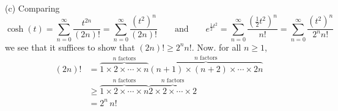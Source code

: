 \begin{solution}
\noindent (c) Comparing
\begin{equation*}
\cosh(t) = \sum_{n=0}^\infty\frac{t^{2n}}{(2n)!}
 = \sum_{n=0}^\infty\frac{{(t^2)}^n}{(2n)!}
\qquad\text{and}\qquad
e^{\frac{1}{2}t^2}
    = \sum_{n=0}^\infty\frac{{(\frac{1}{2}t^2)}^n}{n!}
    = \sum_{n=0}^\infty\frac{{(t^2)}^n}{2^n n!}
\end{equation*}
we see that it suffices to show that $(2n)! \ge 2^n n!$.
Now. for all $n\ge 1$,
\begin{align*}
(2n)! &=\overbrace{1\times 2\times\cdots\times n}^{n\text{ factors}}
      \overbrace{(n+1)\times (n+2)\times\cdots\times 2n}^{n\text{ factors}} \\
&\ge\overbrace{1\times 2\times\cdots\times n}^{n\text{ factors}}
      \overbrace{2\times 2\times\cdots\times 2}^{n\text{ factors}} \\
&=2^n\, n!
\end{align*}

\end{solution}














